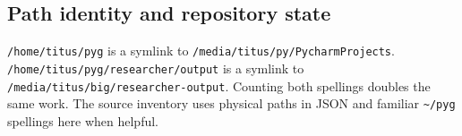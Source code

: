 \documentclass[
  british,
  10pt,
  a4paper,
]{article}
\begin{document}
\subsection{Path identity and repository
state}\label{repository-inventory--path-identity-and-repository-state}

\texttt{/\allowbreak{}home/\allowbreak{}titus/\allowbreak{}pyg} is a
symlink to
\texttt{/\allowbreak{}media/\allowbreak{}titus/\allowbreak{}py/\allowbreak{}PycharmProje\allowbreak{}cts}.
\texttt{/\allowbreak{}home/\allowbreak{}titus/\allowbreak{}pyg/\allowbreak{}researcher/\allowbreak{}output}
is a symlink to
\texttt{/\allowbreak{}media/\allowbreak{}titus/\allowbreak{}big/\allowbreak{}researcher-\allowbreak{}output}.
Counting both spellings doubles the same work. The source inventory uses
physical paths in JSON and familiar \texttt{\textasciitilde{}/pyg}
spellings here when helpful.
\end{document}
